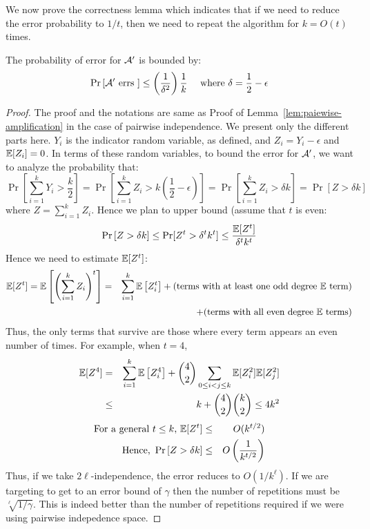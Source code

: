 We now prove the correctness lemma which indicates that if we need to reduce the error probability to $1/t$, then we need to repeat the algorithm for $k=O(t)$ times.
\begin{lemma}
The probability of error for ${\cal A}'$ is bounded by:
$$\Pr\left[{\cal A}' \textrm{ errs }\right] \le \left(\frac{1}{\delta^2}\right)\frac{1}{k} \textrm{~~~~where $\delta = \frac{1}{2}-\epsilon$}$$
\end{lemma}
\begin{proof}
The proof and the notations are same as Proof of Lemma~\ref{lem:paiewise-amplification} in the case of pairwise independence. We present only the different parts here.
$Y_i$ is the indicator random variable, as defined, and $Z_i = Y_i -\epsilon$ and ${\mathbb E}[Z_i]=0$. In terms of these random variables, to bound the error for ${\cal A}'$, we want to analyze the probability that:
$$\Pr \left[ \sum_{i=1}^k Y_i > \frac{k}{2}\right] = \Pr \left[ \sum_{i=1}^k Z_i > k\left(\frac{1}{2}-\epsilon\right) \right] = \Pr \left[ \sum_{i=1}^k Z_i > \delta k \right] =\Pr \left[ Z > \delta k \right] $$
where $Z = \sum_{i=1}^k Z_i$. Hence we plan to upper bound (assume that $t$ is even:
\begin{eqnarray*}
\Pr \left[ Z > \delta k \right] \le \Pr[Z^t > \delta^t k^t] \le \frac{{\mathbb E}[Z^t]}{\delta^tk^t}
\end{eqnarray*}
Hence we need to estimate ${\mathbb E}[Z^t]$:
\begin{eqnarray*}
{\mathbb E}[Z^t] = {\mathbb E}\left[ \left(\sum_{i=1}^k Z_i\right)^t \right] & = &  \sum_{i=1}^k {\mathbb E}\left[Z_i^t\right] + \textrm{(terms with at least one odd degree ${\mathbb E}$ term)} \\ 
&& + \textrm{(terms with all even degree ${\mathbb E}$ terms)}
\end{eqnarray*}
Thus, the only terms that survive are those where every term appears an even number of times. For example, when $t = 4$,
\begin{eqnarray*}
{\mathbb E}[Z^4] & = &  \sum_{i=1}^k {\mathbb E}\left[Z_i^4\right] + {4 \choose 2} \sum_{0 \le i < j \le k} {\mathbb E}[Z_i^2]{\mathbb E}[Z_j^2] \\ 
& \le & k+{4 \choose 2}{k \choose 2} \le 4k^2
\end{eqnarray*}
\begin{eqnarray*}
\textrm{For a general $t \le k$, }{\mathbb E}[Z^t] & \le & O(k^{t/2}) \\
\textrm{Hence, } \Pr \left[ Z > \delta k \right] & \le & O\left(\frac{1}{k^{t/2}}\right)
\end{eqnarray*}
Thus, if we take $2\ell$-independence, the error reduces to $O(1/k^\ell)$. If we are targeting to get to an error bound of $\gamma$ then the number of repetitions must be $\sqrt[\ell]{1/\gamma}$. This is indeed better than the number of repetitions required if we were using pairwise indepedence space.
\end{proof}

